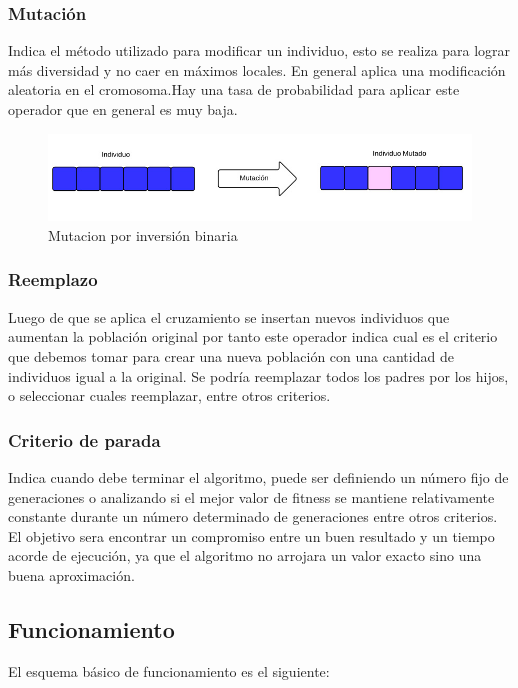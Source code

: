 \subsubsection{Mutación} 
Indica el método utilizado para modificar un individuo, esto se realiza para lograr más diversidad y no caer en máximos locales. En general aplica una modificación aleatoria en el cromosoma.Hay una tasa de probabilidad para aplicar este operador que en general es muy baja. 
\begin{figure}[h]
	\centering
	\includegraphics[width=1\linewidth]{Figures/mutacion1}
	\caption{Mutacion por inversión binaria}
	\label{fig:mutacion1}
\end{figure}


\subsubsection{Reemplazo} 
Luego de que se aplica el cruzamiento se insertan nuevos individuos que aumentan la población original por tanto este operador indica cual es el criterio que debemos tomar para crear una nueva población con una cantidad de individuos igual a la original.
Se podría reemplazar todos los padres por los hijos, o seleccionar cuales reemplazar, entre otros criterios.

\subsubsection{Criterio de parada} 
Indica cuando debe terminar el algoritmo, puede ser definiendo un número fijo de generaciones o analizando si el mejor valor de fitness se mantiene relativamente constante durante un número determinado de generaciones entre otros criterios. El objetivo sera encontrar un compromiso entre un buen resultado y un tiempo acorde de ejecución, ya que el algoritmo no arrojara un valor exacto sino una buena aproximación. 

\subsection{Funcionamiento}

El esquema básico de funcionamiento es el siguiente:


